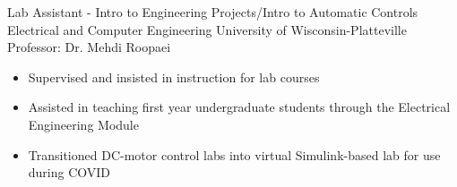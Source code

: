 \documentclass[11pt,letterpaper,roman]{moderncv} %
\begin{document}


{Lab Assistant - Intro to Engineering Projects/Intro to Automatic Controls}
{Electrical and Computer Engineering}
{University of Wisconsin-Platteville}
{Professor: Dr. Mehdi Roopaei}
{\begin{itemize}
    \item Supervised and insisted in instruction for lab courses
    \item Assisted in teaching first year undergraduate students through the Electrical Engineering Module
    \item Transitioned DC-motor control labs into virtual Simulink-based lab for use during COVID
\end{itemize}}

\end{document}
